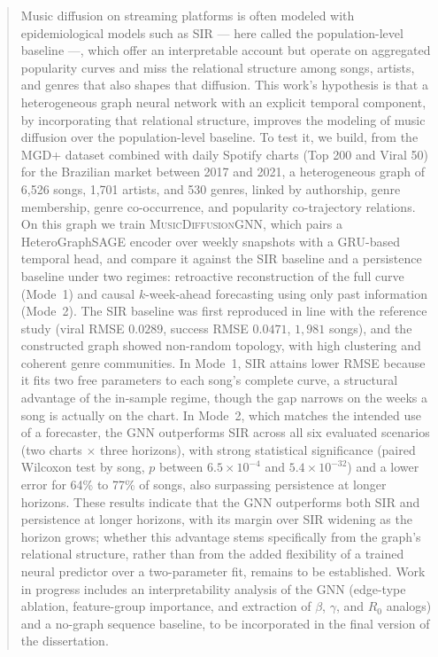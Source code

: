 \begin{abstract}

Music diffusion on streaming platforms is often modeled with epidemiological models such as SIR — here called the population-level baseline —, which offer an interpretable account but operate on aggregated popularity curves and miss the relational structure among songs, artists, and genres that also shapes that diffusion. This work's hypothesis is that a heterogeneous graph neural network with an explicit temporal component, by incorporating that relational structure, improves the modeling of music diffusion over the population-level baseline. To test it, we build, from the MGD+ dataset combined with daily Spotify charts (Top 200 and Viral 50) for the Brazilian market between 2017 and 2021, a heterogeneous graph of 6,526 songs, 1,701 artists, and 530 genres, linked by authorship, genre membership, genre co-occurrence, and popularity co-trajectory relations. On this graph we train \textsc{MusicDiffusionGNN}, which pairs a HeteroGraphSAGE encoder over weekly snapshots with a GRU-based temporal head, and compare it against the SIR baseline and a persistence baseline under two regimes: retroactive reconstruction of the full curve (Mode~1) and causal $k$-week-ahead forecasting using only past information (Mode~2). The SIR baseline was first reproduced in line with the reference study (viral RMSE $0.0289$, success RMSE $0.0471$, $1,981$ songs), and the constructed graph showed non-random topology, with high clustering and coherent genre communities. In Mode~1, SIR attains lower RMSE because it fits two free parameters to each song's complete curve, a structural advantage of the in-sample regime, though the gap narrows on the weeks a song is actually on the chart. In Mode~2, which matches the intended use of a forecaster, the GNN outperforms SIR across all six evaluated scenarios (two charts $\times$ three horizons), with strong statistical significance (paired Wilcoxon test by song, $p$ between $6.5\times10^{-4}$ and $5.4\times10^{-32}$) and a lower error for 64\% to 77\% of songs, also surpassing persistence at longer horizons. These results indicate that the GNN outperforms both SIR and persistence at longer horizons, with its margin over SIR widening as the horizon grows; whether this advantage stems specifically from the graph's relational structure, rather than from the added flexibility of a trained neural predictor over a two-parameter fit, remains to be established. Work in progress includes an interpretability analysis of the GNN (edge-type ablation, feature-group importance, and extraction of $\beta$, $\gamma$, and $R_0$ analogs) and a no-graph sequence baseline, to be incorporated in the final version of the dissertation.

\end{abstract}
